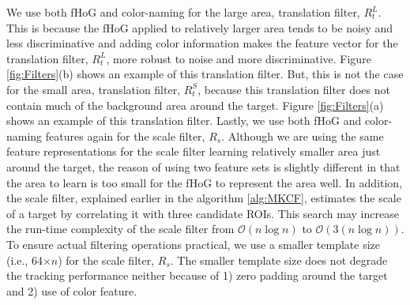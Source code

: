 \documentclass[10pt,twocolumn,letterpaper]{article}
\begin{document}
We use both fHoG \cite{felzenszwalb2010object} and color-naming
\cite{van2009learning} for the large area, translation filter,
$R_{t}^{L}$. This is because the fHoG applied to relatively larger
area tends to be noisy and less discriminative and adding color
information makes the feature vector for the translation filter,
$R_{t}^{L}$, more robust to noise and more discriminative. Figure
\ref{fig:Filters}(b) shows an example of this translation filter. But,
this is not the case for the small area, translation filter,
$R_{t}^{S}$, because this translation filter does not contain much of
the background area around the target. Figure \ref{fig:Filters}(a)
shows an example of this translation filter. Lastly, we use both fHoG
and color-naming features again for the scale filter,
$R_{s}$. Although we are using the same feature representations for
the scale filter learning relatively smaller area just around the
target, the reason of using two feature sets is slightly different in
that the area to learn is too small for the fHoG to represent the area
well. In addition, the scale filter, explained earlier in the
algorithm \ref{alg:MKCF}, estimates the scale of a target by
correlating it with three candidate ROIs. This search may increase the
run-time complexity of the scale filter from $\mathcal{O}(n\log n)$ to
$\mathcal{O}(3(n\log n))$. To ensure actual filtering operations
practical, we use a smaller template size (i.e., 64$\times n$) for the
scale filter, $R_{s}$. The smaller template size does not degrade the
tracking performance neither because of 1) zero padding around the
target and 2) use of color feature.
\end{document}
